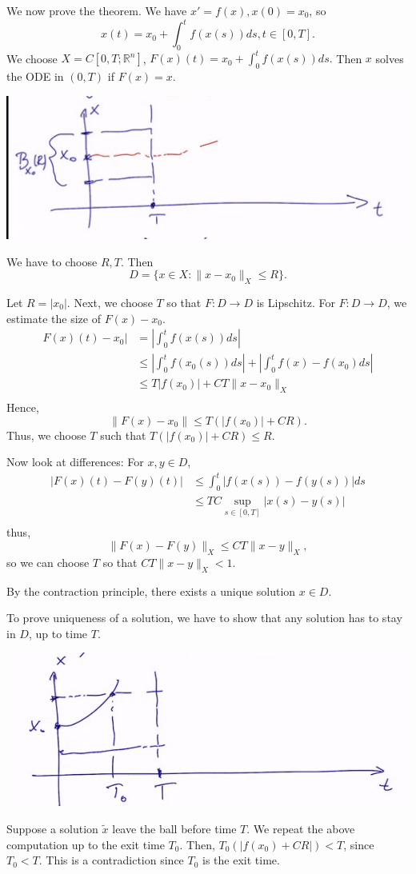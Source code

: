 \documentclass[12pt]{scrartcl}
\newcommand{\R}{\mathbb{R}}
\begin{document}
We now prove the theorem.  We have $x' = f(x), x(0) = x_0$, so 
$$x(t) = x_0 + \int_{0}^t f(x(s))ds, t \in [0, T].$$
We choose $X = C[0, T; \R^n]$, $F(x)(t) = x_0 + \int_{0}^t f(x(s))ds.$ Then $x$ solves the ODE in $(0, T)$ if $F(x) = x$.
\begin{center}
\includegraphics[scale=0.5]{ball.png}
\end{center}
We have to choose $R, T$.  Then
$$D = \{x \in X : \|x - x_0 \|_X \le R\}.$$

Let $R = |x_0|$.  Next, we choose $T$ so that $F : D \rightarrow D$ is Lipschitz.  For $F: D \rightarrow D$, we estimate the size of $F(x) - x_0$.
\begin{align*}
F(x)(t) - x_0| &= \left |\int_0^t f(x(s))ds\right | \\
&\le \left |\int_0^t f(x_0(s))ds\right | + \left | \int_0^t f(x) - f(x_0) ds \right | \\
&\le T |f(x_0)| + CT\|x - x_0\|_X  \\
\end{align*}
Hence,
$$\|F(x) - x_0\| \le T(|f(x_0)| + CR).$$
Thus, we choose $T$ such that $T(|f(x_0)| + CR) \le R$.

Now look at differences: For $x, y \in D$,
\begin{align*}
|F(x)(t) - F(y)(t)| &\le \int_{0}^t |f(x(s)) - f(y(s))| ds\\
&\le T C\sup_{s \in [0, T]} |x(s) - y(s)| \\
\end{align*}
thus,
$$\|F(x) - F(y)\|_X \le CT \|x - y\|_X,$$
so we can choose $T$ so that $CT\|x-y \|_X < 1$.

By the contraction principle, there exists a unique solution $x \in D$.  

To prove uniqueness of a solution, we have to show that any solution has to stay in $D$, up to time $T$.

\begin{center}
\includegraphics[scale=0.5]{unique.png}
\end{center}
Suppose a solution $\tilde{x}$ leave the ball before time $T$.  We repeat the above computation up to the exit time $T_0$.  Then, $T_0(|f(x_0) + CR|) < T$, since $T_0 < T$.  This is a contradiction since $T_0$ is the exit time.
\end{document}
